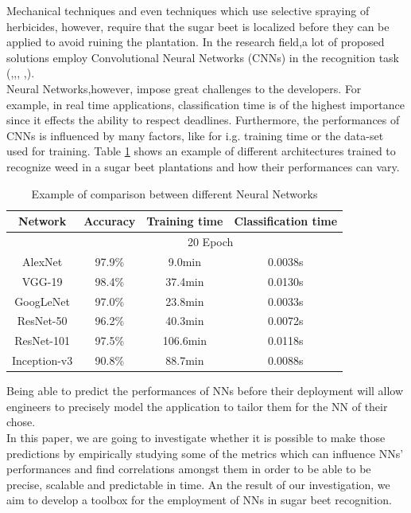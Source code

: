 Mechanical techniques and even techniques which use selective spraying of herbicides, however, require that the sugar beet is localized before they can be applied to avoid ruining the plantation. In the research field,a lot of proposed solutions employ Convolutional Neural Networks (CNNs) in the recognition task (\cite{gao_deep_2020},\cite{suh_transfer_2018},\cite{ramirez_deep_2020}, \cite{milioto2017real},\cite{agriculture11111111}).\\
Neural Networks,however, impose great challenges to the developers. For example, in real time applications, classification time is of the highest importance since it effects the ability to respect deadlines. Furthermore, the performances of CNNs is influenced by many factors, like for i.g. training time or the data-set used for training. Table \ref{tab:models_ex_comp} shows an example of different architectures trained to recognize weed in a sugar beet plantations and how their performances can vary. \\ 
\begin{table}[th]
\centering
\begin{tabular}{|c| ccc|}
  \hline
 Network &Accuracy& Training time   &Classification time   \\
 \hline
 &\multicolumn{3}{c|}{20 Epoch}\\
 \hline
AlexNet &97.9\%& 9.0min   &0.0038s    \\
VGG-19 &98.4\%& 37.4min   &0.0130s  \\
GoogLeNet &97.0\%& 23.8min  &0.0033s \\
ResNet-50 &96.2\%& 40.3min  &0.0072s\\
ResNet-101 &97.5\%& 106.6min   &0.0118s \\
Inception-v3 &90.8\%& 88.7min &0.0088s \\
\hline
\end{tabular}
\caption[Example of comparison between different Neural Networks]{Example of comparison between different Neural Networks \cite{suh_transfer_2018}}
 \label{tab:models_ex_comp}
\end{table}
Being able to predict the performances of NNs before their deployment will allow engineers to precisely model the application to tailor them for the NN of their chose. \\
In this paper, we are going to investigate whether it is possible to make those predictions by empirically studying some of the metrics which can influence NNs' performances and find correlations amongst them in order to be able to be precise, scalable and predictable in time. An the result of our investigation, we aim to develop a toolbox for the employment of NNs in sugar beet recognition.\\
